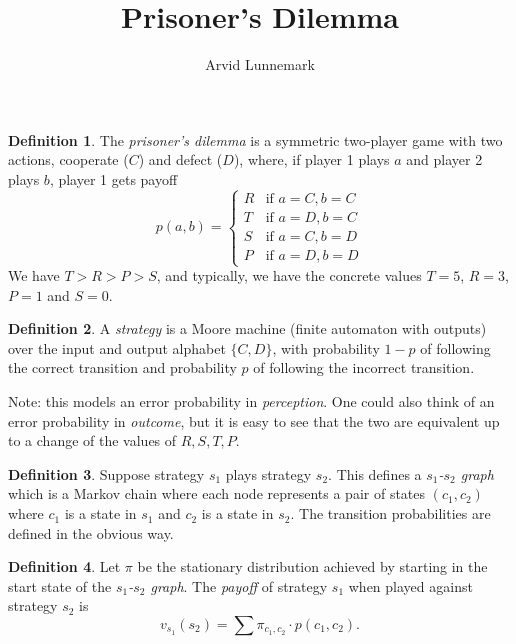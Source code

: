 \documentclass[11pt]{amsart}
\title{Prisoner's Dilemma}
\author{Arvid Lunnemark}
\theoremstyle{definition}
\newtheorem{definition}{Definition}
\theoremstyle{remark}
\begin{document}
\maketitle

\begin{definition}
  The \textit{prisoner's dilemma} is a symmetric two-player game with two actions, cooperate ($C$) and defect ($D$), where, if player 1 plays $a$ and player 2 plays $b$, player 1 gets payoff 
  \begin{equation*}
    p(a,b) = \begin{cases}
      R &\text{if $a = C, b = C$} \\
      T &\text{if $a = D, b = C$} \\
      S &\text{if $a = C, b = D$} \\
      P &\text{if $a = D, b = D$}
    \end{cases}
  \end{equation*}
  We have $T > R > P > S$, and typically, we have the concrete values $T = 5$, $R = 3$, $P = 1$ and $S = 0$.
\end{definition}

\begin{definition}
  A \textit{strategy} is a Moore machine (finite automaton with outputs) over the input and output alphabet $\{C, D\}$, with probability $1-p$ of following the correct transition and probability $p$ of following the incorrect transition. 
\end{definition}

Note: this models an error probability in \textit{perception}. One could also think of an error probability in \textit{outcome}, but it is easy to see that the two are equivalent up to a change of the values of $R, S, T, P$.

\begin{definition}
  Suppose strategy $s_1$ plays strategy $s_2$. This defines a \textit{$s_1$-$s_2$ graph} which is a Markov chain where each node represents a pair of states $(c_1,c_2)$ where $c_1$ is a state in $s_1$ and $c_2$ is a state in $s_2$. The transition probabilities are defined in the obvious way.
\end{definition}

\begin{definition}
  Let $\pi$ be the stationary distribution achieved by starting in the start state of the \textit{$s_1$-$s_2$ graph}. The \textit{payoff} of strategy $s_1$ when played against strategy $s_2$ is \begin{equation*}
    v_{s_1}(s_2) = \sum \pi_{c_1, c_2} \cdot p(c_1, c_2).
  \end{equation*}
\end{definition}
\end{document}
